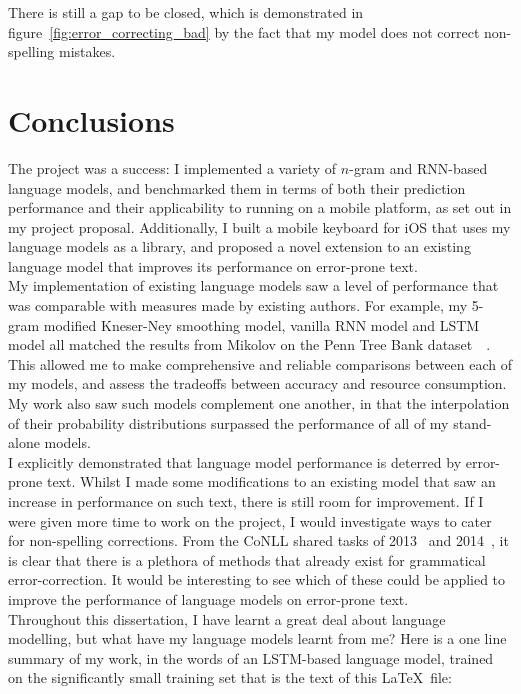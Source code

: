 \documentclass[a4paper, 12pt]{report}
\begin{document}
There is still a gap to be closed, which is demonstrated in figure~\ref{fig:error_correcting_bad} by the fact that my model does not correct non-spelling mistakes.

\chapter{Conclusions}

The project was a success: I implemented a variety of $n$-gram and RNN-based language models, and benchmarked them in terms of both their prediction performance and their applicability to running on a mobile platform, as set out in my project proposal. Additionally, I built a mobile keyboard for iOS that uses my language models as a library, and proposed a novel extension to an existing language model that improves its performance on error-prone text. \\

My implementation of existing language models saw a level of performance that was comparable with measures made by existing authors. For example, my 5-gram modified Kneser-Ney smoothing model, vanilla RNN model and LSTM model all matched the results from Mikolov on the Penn Tree Bank dataset~\cite{rnn_ptb:mikolov2012}~\cite{lstm_ptb:mikolov2014}. This allowed me to make comprehensive and reliable comparisons between each of my models, and assess the tradeoffs between accuracy and resource consumption. My work also saw such models complement one another, in that the interpolation of their probability distributions surpassed the performance of all of my stand-alone models. \\

I explicitly demonstrated that language model performance is deterred by error-prone text. Whilst I made some modifications to an existing model that saw an increase in performance on such text, there is still room for improvement. If I were given more time to work on the project, I would investigate ways to cater for non-spelling corrections. From the CoNLL shared tasks of 2013~\cite{error_correction2013:ng2013} and 2014~\cite{error_correction2014:ng2014}, it is clear that there is a plethora of methods that already exist for grammatical error-correction. It would be interesting to see which of these could be applied to improve the performance of language models on error-prone text. \\

Throughout this dissertation, I have learnt a great deal about language modelling, but what have my language models learnt from me? Here is a one line summary of my work, in the words of an LSTM-based language model, trained on the significantly small training set that is the text of this \LaTeX\ file:
\end{document}
